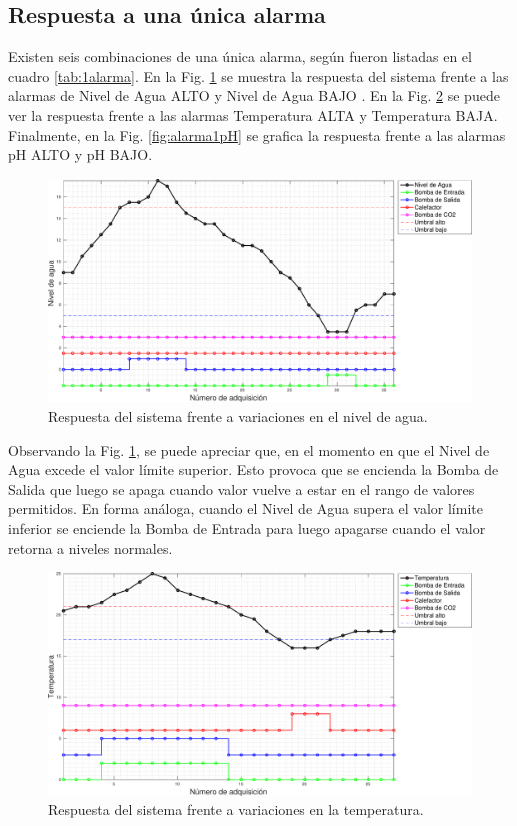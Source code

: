 \subsection{Respuesta a una única alarma}
\label{sec:1alarma}
Existen seis combinaciones de una única alarma, según fueron listadas en el cuadro \ref{tab:1alarma}. En la Fig. \ref{fig:alarma1Nivel} se muestra la respuesta del sistema frente a las alarmas de Nivel de Agua ALTO y Nivel de Agua BAJO . En la Fig. \ref{fig:alarma1Temp} se puede ver la respuesta frente a las alarmas Temperatura ALTA y Temperatura BAJA. Finalmente, en la Fig. \ref{fig:alarma1pH} se grafica la respuesta frente a las alarmas pH ALTO y pH BAJO.

\begin{figure}[h]
\centering
    \includegraphics[width=\textwidth]{./Figures/plot1Water.pdf}
	\caption{Respuesta del sistema frente a variaciones en el nivel de agua.}
	\label{fig:alarma1Nivel}
\end{figure}

Observando la Fig. \ref{fig:alarma1Nivel}, se puede apreciar que, en el momento en que el Nivel de Agua excede el valor límite superior. Esto provoca que se encienda la Bomba de Salida que luego se apaga cuando valor vuelve a estar en el rango de valores permitidos.  En forma análoga, cuando el Nivel de Agua supera el valor límite inferior se enciende la Bomba de Entrada para luego apagarse cuando el valor retorna a niveles normales.

\begin{figure}[h]
\centering
    \includegraphics[width=\textwidth]{./Figures/plot1Temp.pdf}
	\caption{Respuesta del sistema frente a variaciones en la temperatura.}
	\label{fig:alarma1Temp}
\end{figure}

